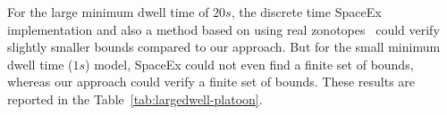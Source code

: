   For the large minimum dwell time of $20s$, the
discrete time SpaceEx implementation and also a method based on using
real zonotopes~\cite{makhlouf2014networked} could verify slightly
smaller bounds compared to our approach.
But for the small minimum dwell time ($1s$) model, SpaceEx could not
even find a finite set of bounds, whereas our approach could verify a
finite set of bounds.  These results are reported in the
Table~\ref{tab:largedwell-platoon}.







